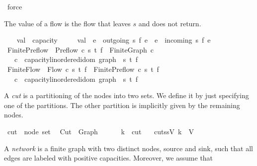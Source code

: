 \begin{isabellebody}
\ force%
\endisatagproof
{\isafoldproof}%
%
\isadelimproof
%
\endisadelimproof
%
\begin{isamarkuptext}%
The value of a flow is the flow that leaves $s$ and does not return.%
\end{isamarkuptext}\isamarkuptrue%
\ \ \isamarkupfalse%
\ val\ {\isacharcolon}{\isacharcolon}\ {\isachardoublequoteopen}{\isacharprime}capacity{\isachardoublequoteclose}\isanewline
\ \ \ \ \ {\isachardoublequoteopen}val\ {\isasymequiv}\ {\isacharparenleft}{\isasymSum}e\ {\isasymin}\ outgoing\ s{\isachardot}\ f\ e{\isacharparenright}\ {\isacharminus}\ {\isacharparenleft}{\isasymSum}e\ {\isasymin}\ incoming\ s{\isachardot}\ f\ e{\isacharparenright}{\isachardoublequoteclose}\isanewline
{}\isamarkupfalse%
\isanewline
\isanewline
{}\isamarkupfalse%
\ Finite{\isacharunderscore}Preflow\ {\isacharequal}\ Preflow\ c\ s\ t\ f\ {\isacharplus}\ Finite{\isacharunderscore}Graph\ c\ \isanewline
\ \ \ c\ {\isacharcolon}{\isacharcolon}\ {\isachardoublequoteopen}{\isacharprime}capacity{\isacharcolon}{\isacharcolon}linordered{\isacharunderscore}idom\ graph{\isachardoublequoteclose}\ \ s\ t\ f\isanewline
\ \ \isanewline
{}\isamarkupfalse%
\ Finite{\isacharunderscore}Flow\ {\isacharequal}\ Flow\ c\ s\ t\ f\ {\isacharplus}\ Finite{\isacharunderscore}Preflow\ c\ s\ t\ f\isanewline
\ \ \ c\ {\isacharcolon}{\isacharcolon}\ {\isachardoublequoteopen}{\isacharprime}capacity{\isacharcolon}{\isacharcolon}linordered{\isacharunderscore}idom\ graph{\isachardoublequoteclose}\ \ s\ t\ f%
\isamarkuptrue%
%
\begin{isamarkuptext}%
A \emph{cut} is a partitioning of the nodes into two sets. 
  We define it by just specifying one of the partitions. 
  The other partition is implicitly given by the remaining nodes.%
\end{isamarkuptext}\isamarkuptrue%
\isamarkupfalse%
\ cut\ {\isacharequal}\ {\isachardoublequoteopen}node\ set{\isachardoublequoteclose}\ \isanewline
\isanewline
{}\isamarkupfalse%
\ Cut\ {\isacharequal}\ Graph\ {\isacharplus}\ \ \isanewline
\ \ \ k\ {\isacharcolon}{\isacharcolon}\ cut\isanewline
\ \ \ cut{\isacharunderscore}ss{\isacharunderscore}V{\isacharcolon}\ {\isachardoublequoteopen}k\ {\isasymsubseteq}\ V{\isachardoublequoteclose}%
\isamarkuptrue%
%
\begin{isamarkuptext}%
A \emph{network} is a finite graph with two distinct nodes, source and sink, 
such that all edges are labeled with positive capacities. 
Moreover, we assume that 


\end{isamarkuptext}
\end{isabellebody}

